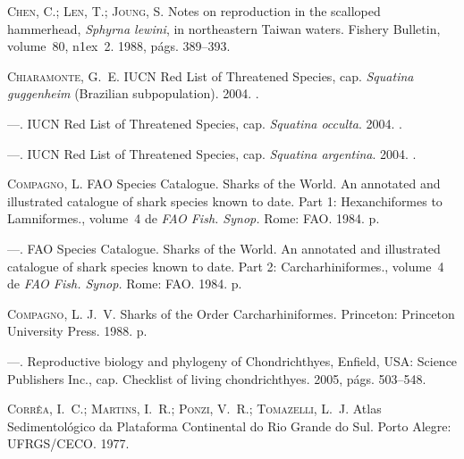 \documentclass[a4paper,11pt,twoside,showtrims,onecolumn,openright,final]{memoir}
\begin{document}
\begin{thebibliography}{194}
\textsc{Chen, C.; Len, T.; Joung, S.}
\newblock Notes on reproduction in the scalloped hammerhead, \emph{{S}phyrna lewini},
  in northeastern {T}aiwan waters.
\newblock Fishery Bulletin, volume~80, n\raise1ex\hbox{}~2. 1988, p\'ags. 389--393.

\textsc{Chiaramonte, G.~E.}
 {IUCN} {R}ed {L}ist of {T}hreatened {S}pecies, cap. \emph{Squatina
  guggenheim} (Brazilian subpopulation). 2004{}.
.

---.
 {IUCN} {R}ed {L}ist of {T}hreatened {S}pecies, cap. \emph{Squatina
  occulta}. 2004{}.
.

---.
 {IUCN} {R}ed {L}ist of {T}hreatened {S}pecies, cap. \emph{Squatina
  argentina}. 2004{}.
.

\textsc{Compagno, L.}
\newblock F{AO} {S}pecies {C}atalogue. {S}harks of the {W}orld. {A}n annotated
  and illustrated catalogue of shark species known to date. {P}art 1:
  {H}exanchiformes to {L}amniformes., volume~4 de \emph{FAO Fish. Synop.}
\newblock Rome: FAO. 1984{}.
 p.

---.
\newblock F{AO} {S}pecies {C}atalogue. {S}harks of the {W}orld. {A}n annotated
  and illustrated catalogue of shark species known to date. {P}art 2:
  {C}archarhiniformes., volume~4 de \emph{FAO Fish. Synop.}
\newblock Rome: FAO. 1984{}.
 p.

\textsc{Compagno, L. J.~V.}
\newblock Sharks of the {O}rder {C}archarhiniformes.
\newblock Princeton: Princeton University Press. 1988.
 p.

---.
\newblock Reproductive biology and phylogeny of {C}hondrichthyes, Enfield, USA:
  Science Publishers Inc., cap. Checklist of living chondrichthyes. 2005,
  p\'ags. 503--548.

\textsc{Corr\^ea, I.~C.; Martins, I.~R.; Ponzi, V.~R.; Tomazelli, L.~J.}
\newblock Atlas {S}edimentol\'ogico da {P}lataforma {C}ontinental do {R}io
  {G}rande do {S}ul.
\newblock Porto Alegre: UFRGS/CECO. 1977.


\end{thebibliography}
\end{document}
